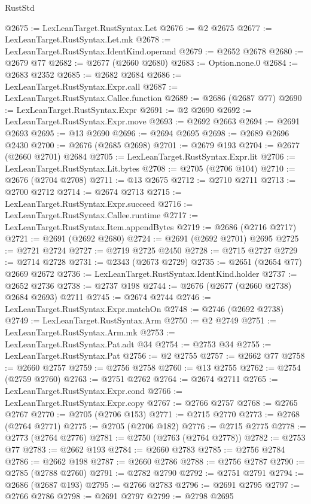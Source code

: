 \begin{lexlean}{RustStd}
\begin{coremodule}
{\begin{coremodule}
{{{{{{{{{{{{{{{{{{{{{{{{{{{{{{{{{{{{{{{{{{{{{{{{{{{{{{{@2675 := LexLeanTarget.RustSyntax.Let
@2676 := @2 @2675
@2677 := LexLeanTarget.RustSyntax.Let.mk
@2678 := LexLeanTarget.RustSyntax.IdentKind.operand
@2679 := @2652 @2678
@2680 := @2679 @77
@2682 := @2677 (@2660 @2680)
@2683 := Option.none.{0}
@2684 := @2683 @2352
@2685 := @2682 @2684
@2686 := LexLeanTarget.RustSyntax.Expr.call
@2687 := LexLeanTarget.RustSyntax.Callee.function
@2689 := @2686 (@2687 @77)
@2690 := LexLeanTarget.RustSyntax.Expr
@2691 := @2 @2690
@2692 := LexLeanTarget.RustSyntax.Expr.move
@2693 := @2692 @2663
@2694 := @2691 @2693
@2695 := @13 @2690
@2696 := @2694 @2695
@2698 := @2689 @2696 @2430
@2700 := @2676 (@2685 @2698)
@2701 := @2679 @193
@2704 := @2677 (@2660 @2701) @2684
@2705 := LexLeanTarget.RustSyntax.Expr.lit
@2706 := LexLeanTarget.RustSyntax.Lit.bytes
@2708 := @2705 (@2706 @104)
@2710 := @2676 (@2704 @2708)
@2711 := @13 @2675
@2712 := @2710 @2711
@2713 := @2700 @2712
@2714 := @2674 @2713
@2715 := LexLeanTarget.RustSyntax.Expr.succeed
@2716 := LexLeanTarget.RustSyntax.Callee.runtime
@2717 := LexLeanTarget.RustSyntax.Item.appendBytes
@2719 := @2686 (@2716 @2717)
@2721 := @2691 (@2692 @2680)
@2724 := @2691 (@2692 @2701) @2695
@2725 := @2721 @2724
@2727 := @2719 @2725 @2450
@2728 := @2715 @2727
@2729 := @2714 @2728
@2731 := @2343 (@2673 @2729)
@2735 := @2651 (@2654 @77) @2669 @2672
@2736 := LexLeanTarget.RustSyntax.IdentKind.holder
@2737 := @2652 @2736
@2738 := @2737 @198
@2744 := @2676 (@2677 (@2660 @2738) @2684 @2693) @2711
@2745 := @2674 @2744
@2746 := LexLeanTarget.RustSyntax.Expr.matchOn
@2748 := @2746 (@2692 @2738)
@2749 := LexLeanTarget.RustSyntax.Arm
@2750 := @2 @2749
@2751 := LexLeanTarget.RustSyntax.Arm.mk
@2753 := LexLeanTarget.RustSyntax.Pat.adt @34
@2754 := @2753 @34
@2755 := LexLeanTarget.RustSyntax.Pat
@2756 := @2 @2755
@2757 := @2662 @77
@2758 := @2660 @2757
@2759 := @2756 @2758
@2760 := @13 @2755
@2762 := @2754 (@2759 @2760)
@2763 := @2751 @2762
@2764 := @2674 @2711
@2765 := LexLeanTarget.RustSyntax.Expr.cond
@2766 := LexLeanTarget.RustSyntax.Expr.copy
@2767 := @2766 @2757
@2768 := @2765 @2767
@2770 := @2705 (@2706 @153)
@2771 := @2715 @2770
@2773 := @2768 (@2764 @2771)
@2775 := @2705 (@2706 @182)
@2776 := @2715 @2775
@2778 := @2773 (@2764 @2776)
@2781 := @2750 (@2763 (@2764 @2778))
@2782 := @2753 @77
@2783 := @2662 @193
@2784 := @2660 @2783
@2785 := @2756 @2784
@2786 := @2662 @198
@2787 := @2660 @2786
@2788 := @2756 @2787
@2790 := @2785 (@2788 @2760)
@2791 := @2782 @2790
@2792 := @2751 @2791
@2794 := @2686 (@2687 @193)
@2795 := @2766 @2783
@2796 := @2691 @2795
@2797 := @2766 @2786
@2798 := @2691 @2797
@2799 := @2798 @2695
}}}}}}}}}}}}}}}}}}}}}}}}}}}}}}}}}}}}}}}}}}}}}}}}}}}}}}}
\end{coremodule}}
\end{coremodule}
\end{lexlean}
